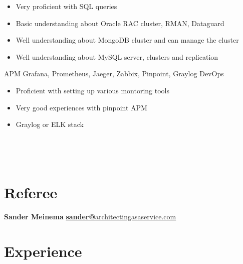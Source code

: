 \documentclass[]{friggeri-cv}
\begin{document}
\begin{entrylist}
{\begin{itemize}
      \item Very proficient with SQL queries
      \item Basic understanding about Oracle RAC cluster, RMAN, Dataguard
      \item Well understanding about MongoDB cluster and can manage the cluster
      \item Well understanding about MySQL server, clusters and replication
    \end{itemize}}
  \entry
  {APM}
  {Grafana, Prometheus, Jaeger, Zabbix, Pinpoint, Graylog}
  {DevOps}
  { \begin{itemize}
      \item Proficient with setting up various montoring tools
      \item Very good experiences with pinpoint APM
      \item Graylog or ELK stack
    \end{itemize}}
\end{entrylist}
\newpage
~

\begin{aside}
  ~
  ~
  ~
  ~
  \section{Referee}
  \textbf{Sander Meinema}
  \href{mailto:sander@architectingasaservice.com}{\textbf{sander@}architectingasaservice.com}
\end{aside}
\section{Experience}
~
\end{document}
